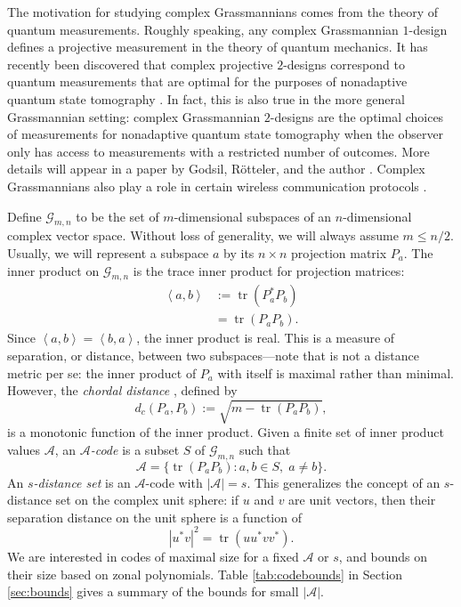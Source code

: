 \documentclass[12pt]{article}
\numberwithin{equation}{section}
\theoremstyle{plainsl}
\newcommand\defn[1]{\textsl{#1}}
\newcommand\gras[2]{\mathcal{G}_{#1,#2}}
\newcommand\ip[2]{\left\langle#1,#2\right\rangle}
\newcommand\scr[1]{{\mathcal#1}}
\newcommand\abs[1]{\left|#1\right|}
\newcommand\opk[1]{\mathop{\mathrm{#1}}\nolimits}
\newcommand\tr{\opk{tr}}
\begin{document}
The motivation for studying complex Grassmannians comes from the theory of quantum measurements. Roughly speaking, any complex Grassmannian $1$-design defines a projective measurement in the theory of quantum mechanics. It has recently been discovered that complex projective $2$-designs correspond to quantum measurements that are optimal for the purposes of nonadaptive quantum state tomography \cite{sco}. In fact, this is also true in the more general Grassmannian setting: complex Grassmannian $2$-designs are the optimal choices of measurements for nonadaptive quantum state tomography when the observer only has access to measurements with a restricted number of outcomes. More details will appear in a paper by Godsil, R\"otteler, and the author \cite{grr}. Complex Grassmannians also play a role in certain wireless communication protocols \cite{aru1}.

Define $\gras{m}{n}$ to be the set of $m$-dimensional subspaces of an $n$-dimensional complex vector space. Without loss of generality, we will always assume $m \leq n/2$. Usually, we will represent a subspace $a$ by its $n \times n$ projection matrix $P_a$. The inner product on $\gras{m}{n}$ is the trace inner product for projection matrices:
\begin{align*}
\ip{a}{b} & := \tr(P_a^*P_b) \\
& = \tr(P_aP_b).
\end{align*}
Since $\ip{a}{b} = \ip{b}{a}$, the inner product is real. This is a measure of separation, or distance, between two subspaces---note that is not a distance metric per se: the inner product of $P_a$ with itself is maximal rather than minimal. However, the \defn{chordal distance} \cite{chs}, defined by 
\[
d_c(P_a,P_b) := \sqrt{m - \tr(P_aP_b)},
\]
is a monotonic function of the inner product. Given a finite set of inner product values $\scr{A}$, an \defn{$\scr{A}$-code} is a subset $S$ of $\gras{m}{n}$ such that 
\[
\scr{A} = \{\tr(P_aP_b): a,b \in S, \; a \neq b \}.
\]
An \defn{$s$-distance set} is an $\scr{A}$-code with $|\scr{A}| = s$. This generalizes the concept of an $s$-distance set on the complex unit sphere: if $u$ and $v$ are unit vectors, then their separation distance on the unit sphere is a function of 
\[
\abs{u^*v}^2  = \tr(uu^*vv^*).
\]
We are interested in codes of maximal size for a fixed $\scr{A}$ or $s$, and bounds on their size based on zonal polynomials. Table \ref{tab:codebounds} in Section \ref{sec:bounds} gives a summary of the bounds for small $\abs{\scr{A}}$.
\end{document}
